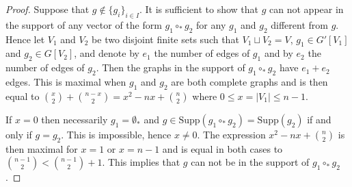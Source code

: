 \documentclass[a4paper]{article}
\theoremstyle{definition}
\begin{document}
\begin{proof}
Suppose that $g\not\in\{g_i\}_{i\in I}$. It is sufficient to show that $g$ can not appear 
in the support of any vector of the form $g_1\circ_{\ast} g_2$ for any $g_1$ and $g_2$ 
different from $g$. Hence let $V_1$ and $V_2$ be two disjoint finite sets such that 
$V_1\sqcup V_2 = V$, $g_1\in G'[V_1]$ and $g_2\in G[V_2]$, and denote by $e_1$ the number 
of edges of $g_1$ and by $e_2$ the number of edges of $g_2$. Then the graphs in the support 
of $g_1\circ_{\ast} g_2$ have $e_1+e_2$ edges. This is maximal when $g_1$ and $g_2$ are 
both complete graphs and is then equal to $\binom{x}{2}+\binom{n-x}{2} = x^2-nx+\binom{n}{2}$ 
where $0\leq x=|V_1|\leq n-1$.

If $x = 0$ then necessarily $g_1 =\emptyset_{\ast}$ and $g\in \text{Supp}(g_1\circ_{\ast}g_2) 
= \text{Supp}(g_2)$ if and only if $g=g_2$. This is impossible, hence $x\not = 0$. The expression 
$x^2-nx+\binom{n}{2}$ is then maximal for $x=1$ or $x=n-1$ and is equal in both cases to 
$\binom{n-1}{2}<\binom{n-1}{2} +1$. This implies that $g$ can not be in the support of $g_1\circ_{\ast} g_2$.
\end{proof}
\end{document}
